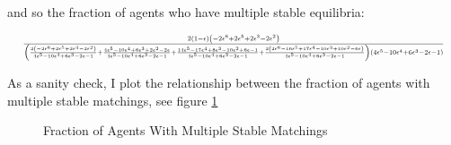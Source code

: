 \documentclass[WP]{AEA}
\begin{document}
and so the fraction of agents who have multiple stable equilibria:

\begin{equation*}
	\resizebox{\textwidth}{!}{
	$
			\frac{2 \left(1 - \epsilon\right) \left(- 2 \epsilon^{6} + 2 \epsilon^{5} + 2 \epsilon^{3} - 2 \epsilon^{2}\right)}{\left(\frac{2 \left(- 2 \epsilon^{6} + 2 \epsilon^{5} + 2 \epsilon^{3} - 2 \epsilon^{2}\right)}{4 \epsilon^{5} - 10 \epsilon^{4} + 6 \epsilon^{3} - 2 \epsilon - 1} + \frac{4 \epsilon^{5} - 10 \epsilon^{4} + 6 \epsilon^{3} + 2 \epsilon^{2} - 2 \epsilon}{4 \epsilon^{5} - 10 \epsilon^{4} + 6 \epsilon^{3} - 2 \epsilon - 1} + \frac{14 \epsilon^{5} - 17 \epsilon^{4} + 8 \epsilon^{3} - 10 \epsilon^{2} + 6 \epsilon - 1}{4 \epsilon^{5} - 10 \epsilon^{4} + 6 \epsilon^{3} - 2 \epsilon - 1} + \frac{2 \left(2 \epsilon^{6} - 16 \epsilon^{5} + 17 \epsilon^{4} - 10 \epsilon^{3} + 10 \epsilon^{2} - 6 \epsilon\right)}{4 \epsilon^{5} - 10 \epsilon^{4} + 6 \epsilon^{3} - 2 \epsilon - 1}\right) \left(4 \epsilon^{5} - 10 \epsilon^{4} + 6 \epsilon^{3} - 2 \epsilon - 1\right)}
	$
}
\end{equation*}

As a sanity check, I plot the relationship between the fraction of agents with multiple stable matchings, see figure \ref{fig:multi_match}

\begin{figure}[p]{Fraction of Agents With Multiple Stable Matchings}\label{fig:multi_match}
\end{figure}
\end{document}
